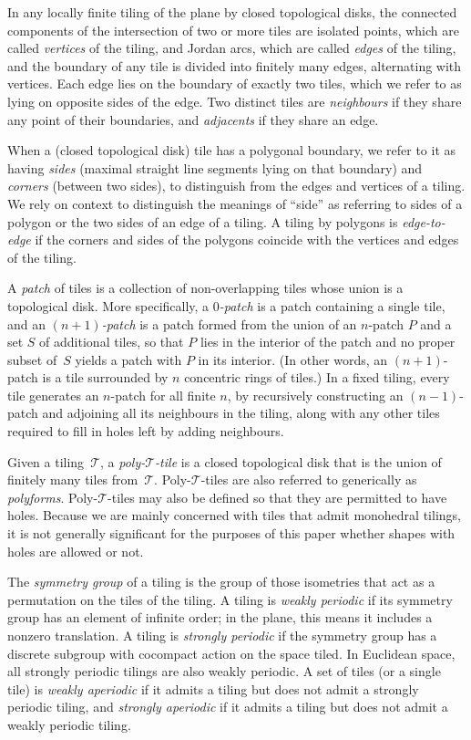 In any locally finite tiling of the plane by closed topological disks,
the connected components of the intersection of two or more tiles are
isolated points, which are called \emph{vertices} of the tiling, and
Jordan arcs, which are called \emph{edges} of the tiling, and the
boundary of any tile is divided into finitely many edges, alternating
with vertices. Each edge lies on the boundary of exactly two tiles,
which we refer to as lying on opposite sides of the edge.  Two
distinct tiles are \emph{neighbours} if they share any point of their
boundaries, and \emph{adjacents} if they share an edge.

When a (closed topological disk) tile has a polygonal boundary, we
refer to it as having \emph{sides} (maximal straight line segments
lying on that boundary) and \emph{corners} (between two sides), to
distinguish from the edges and vertices of a tiling.  We rely on
context to distinguish the meanings of ``side'' as referring to sides
of a polygon or the two sides of an edge of a tiling.  A tiling by
polygons is \emph{edge-to-edge} if the corners and sides of the
polygons coincide with the vertices and edges of the tiling.

A \textit{patch} of tiles is a collection of non-overlapping tiles whose
union is a topological disk.  More specifically, a \textit{$0$-patch}
is a patch containing a single tile, and an \textit{$(n+1)$-patch} is 
a patch formed from the union of an $n$-patch $P$ and a set $S$ of
additional tiles, so that $P$ lies in the interior of the patch and no
proper subset of~$S$ yields a patch with $P$ in its interior.  (In
other words, an $(n+1)$-patch is
a tile surrounded by $n$ concentric rings of tiles.)  In a fixed tiling,
every tile generates an $n$-patch for all finite $n$, by recursively
constructing an $(n-1)$-patch and adjoining all its neighbours in the
tiling, along with any other tiles required to fill in holes left by
adding neighbours.

Given a tiling~$\mathcal{T}$, a \emph{poly-$\mathcal{T}$-tile} is a
closed topological disk that is the union of finitely many tiles
from~$\mathcal{T}$. Poly-$\mathcal{T}$-tiles are also referred to
generically as \emph{polyforms}.  Poly-$\mathcal{T}$-tiles may also
be defined so that they are permitted to have holes.
Because we are mainly concerned with tiles
that admit monohedral tilings, it is not generally significant for the
purposes of this paper whether shapes with holes are allowed or not.

The \emph{symmetry group} of a tiling is the group of those isometries
that act as a permutation on the tiles of the tiling.  A tiling is
\emph{weakly periodic} if its symmetry group has an element of
infinite order; in the plane, this means it includes a nonzero
translation.  A tiling is \emph{strongly periodic} if the symmetry
group has a discrete subgroup with cocompact action on the space
tiled. In Euclidean space, all strongly periodic
tilings are also weakly periodic.  A set of tiles (or a single tile)
is \emph{weakly aperiodic} if it admits a tiling but does not admit a
strongly periodic tiling, and \emph{strongly aperiodic} if it admits a
tiling but does not admit a weakly periodic tiling.

